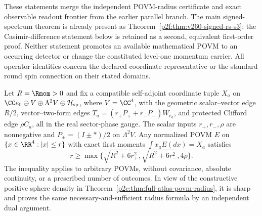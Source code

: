 \documentclass[11pt,a4paper]{article}
\begin{document}
These statements merge the independent POVM-radius certificate and exact
observable readout frontier from the earlier parallel branch. The main
signed-spectrum theorem is already present as
Theorem~\ref{p2f:thm:v260-signed-rs-s3}; the Casimir-difference
statement below is retained as a second, equivalent first-order proof.
Neither statement promotes an
available mathematical POVM to an occurring detector or change the constituted
level-one momentum carrier. All operator identities concern the declared
coordinate representative or the standard round spin connection on their
stated domains.

\begin{theorem}
\label{p2f:thm:v260-full-atlas-dual-radius}
Let \(R=\Rmom>0\) and fix a compatible self-adjoint coordinate tuple
\(X_a\) on
\(\CC e_0\oplus V\oplus\Lambda^2V\oplus\mathcal H_{\rm sp}\), where
\(V=\CC^4\), with the geometric scalar--vector edge \(R/2\),
vector--two-form edges
\(T_a=(r_+P_++r_-P_-)W_{e_a}\), and protected Clifford edge
\(\rho C_a\), all in the real sector-phase gauge. The scalar inputs
\(r_+,r_-,\rho\) are nonnegative and
\(P_\pm=(I\pm*)/2\) on \(\Lambda^2 V\). Any normalized POVM
\(E\) on \(\{x\in\RR^4:|x|\le r\}\) with exact first moments
\(\int x_aE(dx)=X_a\) satisfies
\[
 r\ge\max\{\sqrt{R^2+6r_+^2},\sqrt{R^2+6r_-^2},4\rho\}.
\]
The inequality applies to arbitrary POVMs, without covariance, absolute
continuity, or a prescribed number of outcomes. In view of the constructive
positive sphere density in
Theorem~\ref{p2c:thm:full-atlas-povm-radius}, it is sharp and proves the
same necessary-and-sufficient radius formula by an independent dual argument.
\end{theorem}
\end{document}
